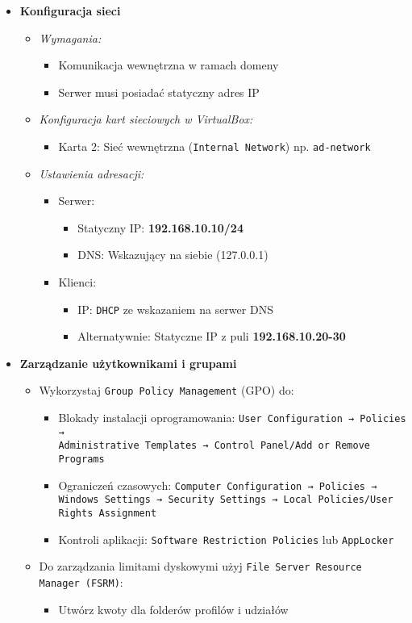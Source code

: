 \begin{itemize}
\item \textbf{Konfiguracja sieci}
\begin{itemize}
\item \textit{Wymagania:}
\begin{itemize}
\item Komunikacja wewnętrzna w ramach domeny
\item Serwer musi posiadać statyczny adres IP
\end{itemize}
\item \textit{Konfiguracja kart sieciowych w VirtualBox:}
\begin{itemize}
\item Karta 2: Sieć wewnętrzna (\texttt{Internal Network}) np. \texttt{ad-network}
\end{itemize}
\item \textit{Ustawienia adresacji:}
\begin{itemize}
\item Serwer:
\begin{itemize}
\item Statyczny IP: \textbf{192.168.10.10/24}
\item DNS: Wskazujący na siebie (127.0.0.1)
\end{itemize}
\item Klienci:
\begin{itemize}
\item IP: \texttt{DHCP} ze wskazaniem na serwer DNS
\item Alternatywnie: Statyczne IP z puli \textbf{192.168.10.20-30}
\end{itemize}
\end{itemize}
\end{itemize}



\item \textbf{Zarządzanie użytkownikami i grupami}
\begin{itemize}
\item Wykorzystaj \texttt{Group Policy Management} (GPO) do:
\begin{itemize}
\item Blokady instalacji oprogramowania: \texttt{User Configuration → Policies →\\ Administrative Templates → Control Panel/Add or Remove Programs}
\item Ograniczeń czasowych: \texttt{Computer Configuration → Policies → Windows Settings → Security Settings → Local Policies/User Rights Assignment}
\item Kontroli aplikacji: \texttt{Software Restriction Policies} lub \texttt{AppLocker}
\end{itemize}
\item Do zarządzania limitami dyskowymi użyj \texttt{File Server Resource Manager (FSRM)}:
\begin{itemize}
\item Utwórz kwoty dla folderów profilów i udziałów
\end{itemize}
\end{itemize}
\end{itemize}
